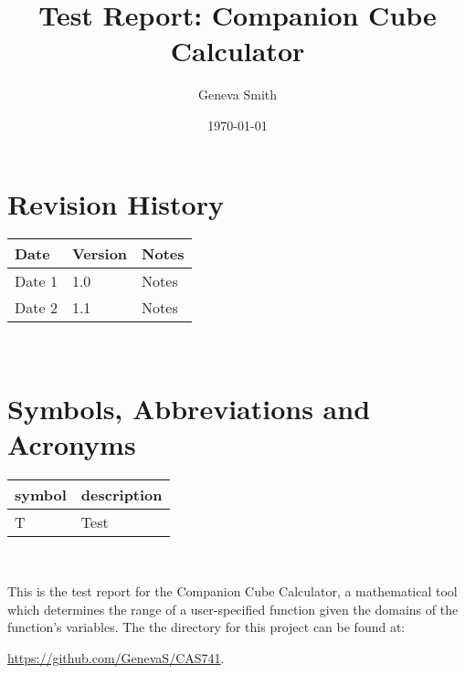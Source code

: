 \documentclass[12pt, titlepage]{article}
\begin{document}
\title{Test Report: Companion Cube Calculator} 
\author{Geneva Smith}
\date{\today}
	
\maketitle


\section{Revision History}

\begin{tabularx}{\textwidth}{p{3cm}p{2cm}X}
\toprule {\bf Date} & {\bf Version} & {\bf Notes}\\
\midrule
Date 1 & 1.0 & Notes\\
Date 2 & 1.1 & Notes\\
\bottomrule
\end{tabularx}

~\newpage

\section{Symbols, Abbreviations and Acronyms}

\renewcommand{\arraystretch}{1.2}
\begin{tabular}{l l} 
  \toprule		
  \textbf{symbol} & \textbf{description}\\
  \midrule 
  T & Test\\
  \bottomrule
\end{tabular}\\


\newpage

\tableofcontents

\listoftables %

\listoffigures %

\newpage


This is the test report for the Companion Cube Calculator, a mathematical 
tool which determines the range of a user-specified function given the domains 
of the function's variables. The the directory for this project can be found at:

\begin{center}
	\href{https://github.com/GenevaS/CAS741}{https://github.com/GenevaS/CAS741}.
\end{center} 
\end{document}
